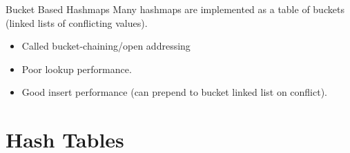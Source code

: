 \begin{sidenotebox}{Bucket Based Hashmaps}
    Many hashmaps are implemented as a table of buckets (linked lists of conflicting values).
    \begin{itemize}
        \item Called bucket-chaining/open addressing
        \item Poor lookup performance.
        \item Good insert performance (can prepend to bucket linked list on conflict).
    \end{itemize}
\end{sidenotebox}


\section{Hash Tables}
